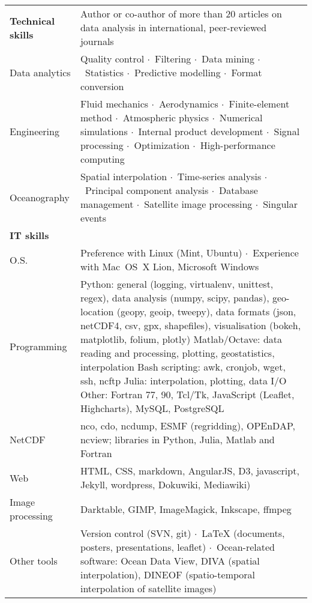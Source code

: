 \documentclass[10pt,a4paper,svgnames]{article}
\newcommand{\sepa}{$\cdot$~}
\begin{document}
\begin{tabular}{p{}| p{}}

\textbf{Technical skills}~\hrulefill& Author or co-author of more than 20 articles on data analysis in international, peer-reviewed journals\\
Data analytics & Quality control \sepa Filtering \sepa Data mining \sepa Statistics \sepa Predictive modelling \sepa Format conversion\\

Engineering & Fluid mechanics \sepa Aerodynamics \sepa Finite-element method \sepa Atmospheric physics \sepa Numerical simulations \sepa Internal product development \sepa Signal processing \sepa Optimization \sepa High-performance computing \\

Oceanography & Spatial interpolation \sepa Time-series analysis \sepa Principal component analysis \sepa Database management \sepa Satellite image processing \sepa Singular events \\

\textbf{IT skills}~\hrulefill& \\ 

O.S.				& Preference with Linux (Mint, Ubuntu) \sepa Experience with Mac~OS~X Lion, Microsoft Windows \\
Programming 		& Python: general (logging, virtualenv, unittest, regex), data analysis (numpy, scipy, pandas), geo-location (geopy, geoip, tweepy), data formats (json, netCDF4, csv, gpx, shapefiles), visualisation (bokeh, matplotlib, folium, plotly) 
\newline Matlab/Octave: data reading and processing, plotting, geostatistics, interpolation
\newline Bash scripting: awk, cronjob, wget, ssh, ncftp
\newline Julia: interpolation, plotting, data I/O
\newline Other: Fortran 77, 90, Tcl/Tk, JavaScript (Leaflet, Highcharts), MySQL, PostgreSQL\\
NetCDF 				& nco, cdo, ncdump, ESMF (regridding),  OPEnDAP, ncview; libraries in Python, Julia, Matlab and Fortran\\
Web 		 		& HTML, CSS, markdown, AngularJS, D3, javascript, Jekyll, wordpress, Dokuwiki, Mediawiki)\\	
Image processing	& Darktable, GIMP, ImageMagick, Inkscape, ffmpeg\\
Other tools 		& Version control (SVN, git) \sepa LaTeX (documents, posters, presentations, leaflet) \sepa  Ocean-related software: Ocean Data View, DIVA (spatial interpolation), DINEOF (spatio-temporal interpolation of satellite images) \\


\end{tabular}
\end{document}
